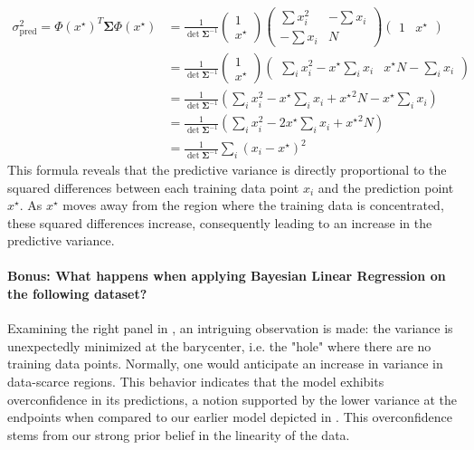 \begin{align*}
    \sigma^2_{\text{pred}} = \Phi (x^\star ) ^T \boldsymbol{\Sigma} \Phi (x^\star ) &= \frac{1}{\det \boldsymbol{\Sigma}^{-1}} \begin{pmatrix}
        1 \\
        x^\star 
    \end{pmatrix} \begin{pmatrix}
        \sum x_i^2 & - \sum x_i \\
        - \sum x_i & N
    \end{pmatrix}\begin{pmatrix}
        1 & x^\star 
    \end{pmatrix} \\
    &= \frac{1}{\det \boldsymbol{\Sigma}^{-1}} \begin{pmatrix}1 \\ x^\star \end{pmatrix} \begin{pmatrix}\sum_i x_i^2 - x^\star \sum_i x_i & x^\star N - \sum_i x_i\end{pmatrix} \\
    &= \frac{1}{\det \boldsymbol{\Sigma}^{-1}}\left(\sum_i x_i^2 - x^\star \sum_i x_i + {x^\star }^2 N - x^\star \sum_i x_i\right) \\
    &= \frac{1}{\det \boldsymbol{\Sigma}^{-1}}\left(\sum_i x_i^2 - 2 x^\star \sum_i x_i + {x^\star }^2 N\right) \\
    &= \frac{1}{\det \boldsymbol{\Sigma}^{-1}}\sum_i \left(x_i - x^\star \right)^2
\end{align*}
This formula reveals that the predictive variance is directly proportional to the squared differences between each training data point $x_i$ and the prediction point $x^\star$. As $x^\star$ moves away from the region where the training data is concentrated, these squared differences increase, consequently leading to an increase in the predictive variance.

\paragraph*{Bonus: What happens when applying Bayesian Linear Regression on the following dataset?}

Examining the right panel in , an intriguing observation is made: the variance is unexpectedly minimized at the barycenter, i.e. the "hole" where there are no training data points. Normally, one would anticipate an increase in variance in data-scarce regions. This behavior indicates that the model exhibits overconfidence in its predictions, a notion supported by the lower variance at the endpoints when compared to our earlier model depicted in . This overconfidence stems from our strong prior belief in the linearity of the data.

